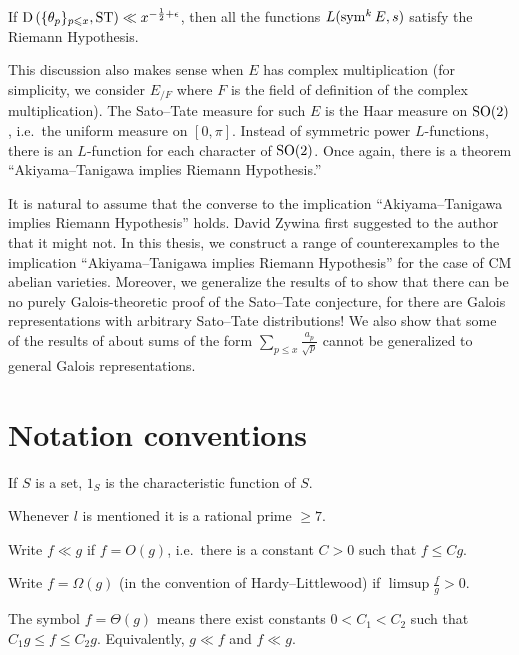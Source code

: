 \begin{theorem}[Mazur]
If $\operatorname{D}\left(\{\theta_p\}_{p\leqslant x},\mathrm{ST}\right)\ll x^{-\frac 1 2+\epsilon}$, 
then all the functions $L(\operatorname{sym}^k E, s)$ satisfy the Riemann Hypothesis. 
\end{theorem}

This discussion also makes sense when $E$ has complex multiplication (for 
simplicity, we consider $E_{/F}$ where $F$ is the field of definition of the 
complex multiplication). The Sato--Tate measure for such $E$ is the Haar 
measure on $\operatorname{SO}(2)$, i.e.~the uniform measure on $[0,\pi]$. Instead of 
symmetric power $L$-functions, there is an $L$-function for each character of 
$\operatorname{SO}(2)$. Once again, there is a theorem ``Akiyama--Tanigawa implies Riemann 
Hypothesis.''

It is natural to assume that the converse to the implication 
``Akiyama--Tanigawa implies Riemann Hypothesis'' holds. David Zywina 
first suggested to the author that it might not. In this thesis, we construct a 
range of counterexamples to the implication ``Akiyama--Tanigawa implies 
Riemann Hypothesis'' for the case of CM abelian varieties. Moreover, we 
generalize the results of \cite{pande-2011} to show that there can be no 
purely Galois-theoretic proof of the Sato--Tate conjecture, for there are 
Galois representations with arbitrary Sato--Tate distributions! We also show 
that some of the results of \cite{sarnak-2007} about sums of the form 
$\sum_{p\leqslant x} \frac{a_p}{\sqrt p}$ cannot be generalized to general 
Galois representations. 





\section{Notation conventions}

If $S$ is a set, $1_S$ is the characteristic function of $S$. 

Whenever $l$ is mentioned it is a rational prime $\geqslant 7$. 

Write $f\ll g$ if $f = O(g)$, i.e.~there is a constant $C>0$ such that 
$f \leqslant C g$. 

Write $f=\Omega(g)$ (in the convention of Hardy--Littlewood) if 
$\limsup \frac f g > 0$. 

The symbol $f = \Theta(g)$ means there exist constants $0<C_1<C_2$ such that 
$C_1 g \leqslant f \leqslant C_2 g$. Equivalently, $g \ll f$ and $f \ll g$. 

